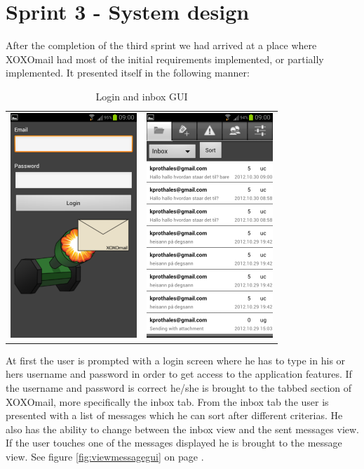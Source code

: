 \section{Sprint 3 - System design}
After the completion of the third sprint we had arrived at a place where XOXOmail had most of the initial requirements implemented, or partially implemented. It presented itself in the following manner:
\newline
\newline
\begin{table}[h!]
\begin{center}
\begin{tabular}{cc}
\includegraphics{logingui} & \includegraphics{inbox}
\end{tabular}
\end{center}
\caption{Login and inbox GUI} \label{tab:logininboxgui}
\end{table}

At first the user is prompted with a login screen where he has to type in his or hers username and password in order to get access to the application features. If the username and password is correct he/she is brought to the tabbed section of XOXOmail, more specifically the inbox tab. From the inbox tab the user is presented with a list of messages which he can sort after different criterias. He also has the ability to change between the inbox view and the sent messages view. If the user touches one of the messages displayed he is brought to the message view. See figure \ref{fig:viewmessagegui} on page \pageref{fig:viewmessagegui}.
\newline

